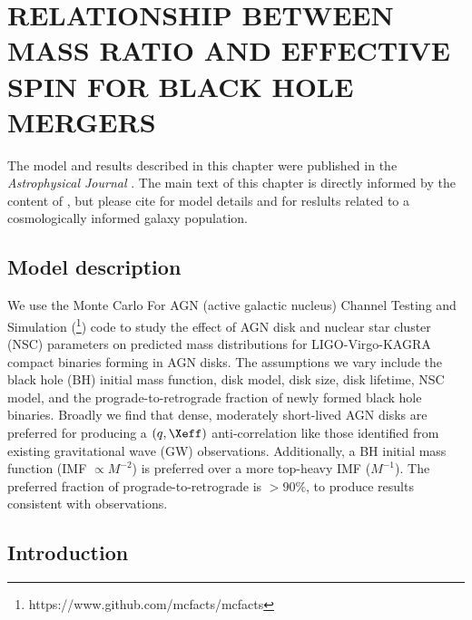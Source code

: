 \section{\texorpdfstring{\MakeUppercase{relationship between mass ratio and effective spin for black hole mergers}}{relationship between mass ratio and effective spin for black hole mergers}}
\label{sec:qXeff}


\par The model and results described in this chapter were published in the \textit{Astrophysical Journal} \citep{McKernan+25-mcfactsI,Cook+25,Delfavero+25}.
The main text of this chapter is directly informed by the content of \citet{Cook+25}, but please cite \citet{McKernan+25-mcfactsI} for model details and \citet{Delfavero+25} for reslults related to a cosmologically informed galaxy population.

\subsection{Model description}
We use the Monte Carlo For AGN (active galactic nucleus) Channel Testing and Simulation (\footnote{https://www.github.com/mcfacts/mcfacts}) code to study the effect of AGN disk and nuclear star cluster (NSC) parameters on predicted mass distributions for LIGO-Virgo-KAGRA compact binaries forming in AGN disks.
The assumptions we vary include the black hole (BH) initial mass function, disk model, disk size, disk lifetime, NSC model, and the prograde-to-retrograde fraction of newly formed black hole binaries.
Broadly we find that dense, moderately short-lived AGN disks are preferred for producing a $(q,\Xeff)$ anti-correlation like those identified from existing gravitational wave (GW) observations.
Additionally, a BH initial mass function (IMF $\propto M^{-2}$) is preferred over a more top-heavy IMF ($M^{-1}$).
The preferred fraction of prograde-to-retrograde is $>90\%$, to produce results consistent with observations.




\subsection{Introduction}
\label{sec:intro-ch2}

